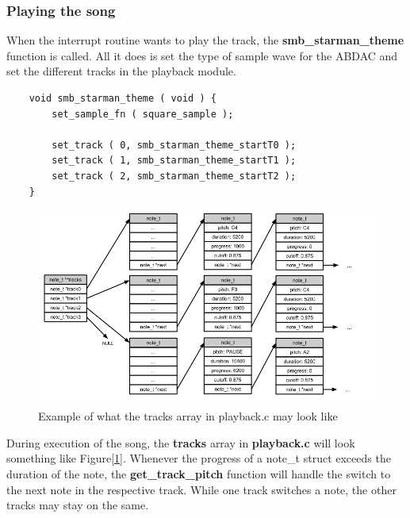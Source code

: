 \subsubsection{Playing the song}
When the interrupt routine wants to play the track, the \textbf{smb\_starman\_theme} function 
is called. All it does is set the type of sample wave for the ABDAC and set the 
different tracks in the playback module.
\begin{lstlisting}
	void smb_starman_theme ( void ) {
		set_sample_fn ( square_sample );

		set_track ( 0, smb_starman_theme_startT0 );
		set_track ( 1, smb_starman_theme_startT1 );
		set_track ( 2, smb_starman_theme_startT2 );
	}
\end{lstlisting}
\begin{figure}[h]
	\centerline{{\includegraphics[width=480px]{tracks_example.png}}}
	\caption{Example of what the tracks array in playback.c may look like}
	\label{tracks-example}
\end{figure}
During execution of the song, the \textbf{tracks} array in \textbf{playback.c} 
will look something like Figure[\ref{tracks-example}].
Whenever the progress of a note\_t struct exceeds the duration of the note, 
the \textbf{get\_track\_pitch} function will handle the switch 
to the next note in the respective track. While one
track switches a note, the other tracks may stay on the same.
